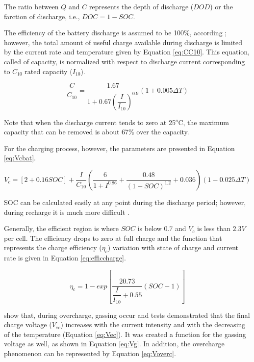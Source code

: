 The ratio between $ Q $ and $ C $ represents the depth of discharge ($ DOD $) or the farction of discharge, i.e., $ DOC=1-SOC $.

The efficiency of the battery discharge is assumed to be 100\%, according \cite{Copetti}; however, the total amount of useful charge available during discharge is limited by the current rate and temperature given by Equation \ref{eq:CC10}. This equation, called of capacity, is normalized with respect to discharge current corresponding to $ C_{10} $ rated capacity ($ I_{10} $).

\begin{equation}
\label{eq:CC10}
\dfrac{C}{C_{10}} = \dfrac{1.67}{1+0.67 \left( \dfrac{I}{I_{10}} \right)^{0.9} }(1+0.005 \Delta T)
\end{equation}

Note that when the discharge current tends to zero at 25$^{o}$C, the maximum capacity that can be removed is about 67\% over the capacity.

For the charging process, however, the parameters are presented in Equation \ref{eq:Vcbat}.

\begin{equation}
\label{eq:Vcbat}
V_{c} = [2+0.16SOC]+ \dfrac{I}{C_{10}} \left( \dfrac{6}{1+I^{0.86}} + \dfrac{0.48}{(1-SOC)^{1.2}} + 0.036  \right) (1-0.025 \Delta T)
\end{equation}

SOC can be calculated easily at any point during the discharge period; however, during recharge it is much more difficult \cite{Copetti}.

Generally, the efficient region is where $ SOC $ is below $ 0.7 $ and $ V_{c} $ is less than $2.3 V$ per cell. The efficiency drops to zero at full charge and the function that represents the charge efficiency ($ \eta_{c} $) variation with state of charge and current rate is given in Equation \ref{eq:efficcharge}.

\begin{equation}
\label{eq:efficcharge}
\eta_{c} = 1 - exp \left[ \dfrac{20.73}{\dfrac{I}{I_{10}}+0.55} (SOC-1) \right] 
\end{equation}

\cite{Copetti} show that, during overcharge, gassing occur and tests demonstrated that the final charge voltage ($ V_{ec} $) increases with the current intensity and with the decreasing of the temperature (Equation \ref{eq:Vec}). It was created a function for the gassing voltage as well, as shown in Equation \ref{eq:Vg}. In addition, the overcharge phenomenon can be represented by Equation \ref{eq:Voverc}.

